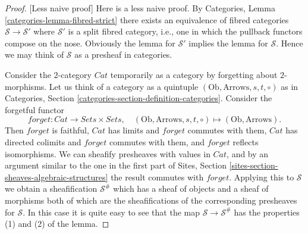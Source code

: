 \begin{proof}
[Less naive proof]
Here is a less naive proof.
By Categories, Lemma \ref{categories-lemma-fibred-strict}
there exists an equivalence of
fibred categories $\mathcal{S} \to \mathcal{S}'$ where $\mathcal{S}'$
is a split fibred category, i.e., one in which the pullback
functors compose on the nose. Obviously the lemma for $\mathcal{S}'$
implies the lemma for $\mathcal{S}$. Hence we may think of $\mathcal{S}$
as a presheaf in categories.

\medskip\noindent
Consider the $2$-category $\textit{Cat}$ temporarily as a
category by forgetting about $2$-morphisms.
Let us think of a category as a quintuple
$(\text{Ob}, \text{Arrows}, s, t, \circ)$ as in
Categories, Section \ref{categories-section-definition-categories}.
Consider the forgetful functor
$$
forget : \textit{Cat} \to \textit{Sets} \times \textit{Sets}, \quad
(\text{Ob}, \text{Arrows}, s, t, \circ)
\mapsto
(\text{Ob}, \text{Arrows}).
$$
Then $forget$ is faithful, $\textit{Cat}$ has limits and
$forget$ commutes with them, $\textit{Cat}$ has directed colimits and
$forget$ commutes with them, and $forget$ reflects isomorphisms.
We can sheafify presheaves with values in $\textit{Cat}$, and
by an argument similar to the one in the first part of
Sites, Section \ref{sites-section-sheaves-algebraic-structures}
the result commutes with $forget$. Applying this to
$\mathcal{S}$ we obtain a sheafification $\mathcal{S}^\#$
which has a sheaf of objects and a sheaf of morphisms
both of which are the sheafifications of the corresponding
presheaves for $\mathcal{S}$. In this case it is quite
easy to see that the map $\mathcal{S} \to \mathcal{S}^\#$
has the properties (1) and (2) of the lemma.


\end{proof}

